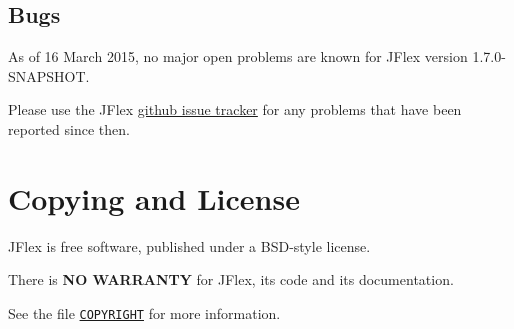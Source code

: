 \subsection{Bugs}\label{bugs}

As of 16 March 2015, no major open problems are known for JFlex version
1.7.0-SNAPSHOT.

Please use the JFlex
\href{https://github.com/jflex-de/jflex/labels/bug}{github issue
tracker} for any problems that have been reported since then.

\section{Copying and License}\label{Copyright}

JFlex is free software, published under a BSD-style license.

There is \textbf{NO WARRANTY} for JFlex, its code and its documentation.

See the file \href{COPYRIGHT}{\texttt{COPYRIGHT}} for more information.
